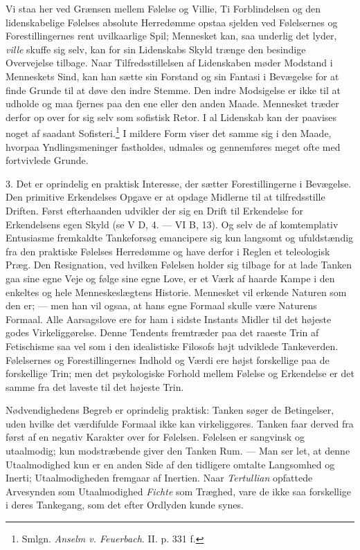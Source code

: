 \documentclass[12pt,a4paper,openany]{book}
\newcommand{\opage}[1]{\marginnote{\footnotesize\textit{[#1]}}}
\begin{document}
Vi staa her ved Grænsen mellem Følelse og Villie, Ti Forblindelsen og
den lidenskabelige Følelses absolute Herredømme opstaa sjelden ved
Følelsernes og Forestillingernes rent uvilkaarlige Spil; Mennesket kan,
saa underlig det lyder, \emph{ville} skuffe sig selv, kan for sin
Lidenskabs Skyld trænge den besindige Overvejelse tilbage. Naar
Tilfredsstillelsen af Lidenskaben møder Modstand i Menneskets Sind, kan
han sætte sin Forstand og sin Fantasi i Bevægelse for at finde Grunde
til at døve den indre Stemme. Den indre Modsigelse er ikke til at
udholde og maa fjernes paa den ene eller den anden Maade. Mennesket
træder derfor op over for sig selv som sofistisk Retor. I al Lidenskab
kan der paavises noget af saadant Sofisteri.\footnote[1]{Smlgn. \emph{Anselm v. Feuerbach}. II. p. 331 f.} I mildere Form viser det samme sig i den
Maade, hvorpaa Yndlingsmeninger fastholdes, udmales og gennemføres meget
ofte med fortvivlede Grunde.

3. Det er oprindelig en praktisk Interesse, der sætter Forestillingerne
i Bevægelse. Den primitive Erkendelses Opgave er at opdage Midlerne til
at tilfredsstille Driften. Først
\opage{356}efterhaanden udvikler der sig en Drift til Erkendelse for
Erkendelsens egen Skyld (se V D, 4. --- VI B, 13). Og selv de af
komtemplativ Entusiasme fremkaldte Tankeforsøg emancipere sig kun
langsomt og ufuldstændig fra den praktiske Følelses Herredømme og have
derfor i Reglen et teleologisk Præg. Den Resignation, ved hvilken
Følelsen holder sig tilbage for at lade Tanken gaa sine egne Veje og
følge sine egne Love, er et Værk af haarde Kampe i den enkeltes og hele
Menneskeslægtens Historie. Mennesket vil erkende Naturen som den er; ---
men han vil ogsaa, at hans egne Formaal skulle være Naturens Formaal.
Alle Aarsagslove ere for ham i sidste Instants Midler til det højeste
godes Virkeliggørelse. Denne Tendents fremtræder paa det raaeste Trin af
Fetischisme saa vel som i den idealistiske Filosofs højt udviklede
Tankeverden. Følelsernes og Forestillingernes Indhold og Værdi ere højst
forskellige paa de forskellige Trin; men det psykologiske Forhold mellem
Følelse og Erkendelse er det samme fra det laveste til det højeste Trin.

Nødvendighedens Begreb er oprindelig praktisk: Tanken søger de
Betingelser, uden hvilke det værdifulde Formaal ikke kan virkeliggøres.
Tanken faar derved fra først af en negativ Karakter over for Følelsen.
Følelsen er sangvinsk og utaalmodig; kun modstræbende giver den Tanken
Rum. --- Man ser let, at denne Utaalmodighed kun er en anden Side af den
tidligere omtalte Langsomhed og Inerti; Utaalmodigheden fremgaar af
Inertien. Naar \emph{Tertullian} opfattede Arvesynden som Utaalmodighed
\emph{Fichte} som Træghed, vare de ikke saa forskellige i deres
Tankegang, som det efter Ordlyden kunde synes.
\end{document}
